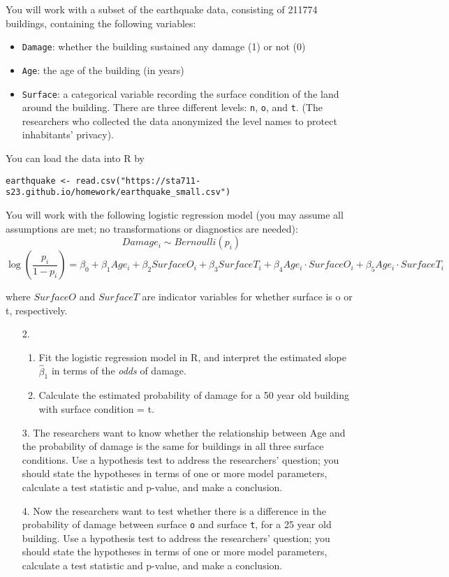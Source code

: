 \documentclass[11pt]{article}
\begin{document}
\noindent You will work with a subset of the earthquake data, consisting of 211774 buildings, containing the following variables:
\begin{itemize}
\item \verb;Damage;: whether the building sustained any damage (1) or not (0)

\item \verb;Age;: the age of the building (in years)

\item \verb;Surface;: a categorical variable recording the surface condition of the land around the building. There are three different levels: \verb;n;, \verb;o;, and \verb;t;. (The researchers who collected the data anonymized the level names to protect inhabitants' privacy).
\end{itemize}

\noindent You can load the data into R by
\begin{verbatim}
earthquake <- read.csv("https://sta711-s23.github.io/homework/earthquake_small.csv")
\end{verbatim}

\noindent You will work with the following logistic regression model (you may assume all assumptions are met; no transformations or diagnostics are needed):
$$Damage_i \sim Bernoulli(p_i)$$
$$\log \left( \dfrac{p_i}{1 - p_i} \right) = \beta_0 + \beta_1 Age_i + \beta_2 SurfaceO_i + \beta_3 SurfaceT_i + \beta_4 Age_i \cdot SurfaceO_i + \beta_5 Age_i \cdot SurfaceT_i$$

where $SurfaceO$ and $SurfaceT$ are indicator variables for whether surface is o or t, respectively.\\

\begin{enumerate}
\item[2.] 
\begin{enumerate}
\item Fit the logistic regression model in R, and interpret the estimated slope $\widehat{\beta}_1$ in terms of the \textit{odds} of damage.

\item Calculate the estimated probability of damage for a 50 year old building with surface condition = t.
\end{enumerate}

\item[3.] The researchers want to know whether the relationship between Age and the probability of damage is the same for buildings in all three surface conditions. Use a hypothesis test to address the researchers' question; you should state the hypotheses in terms of one or more model parameters, calculate a test statistic and p-value, and make a conclusion.

\item[4.] Now the researchers want to test whether there is a difference in the probability of damage between surface \verb;o; and surface \verb;t;, for a 25 year old building. Use a hypothesis test to address the researchers' question; you should state the hypotheses in terms of one or more model parameters, calculate a test statistic and p-value, and make a conclusion.
\end{enumerate}
\end{document}
